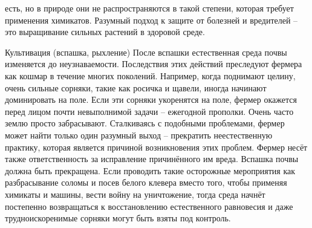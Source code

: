 \documentclass[a4paper]{book}
\begin{document}
есть, но в природе они не распространяются в такой степени, которая требует применения
химикатов. Разумный подход к защите от болезней и вредителей – это выращивание сильных
растений в здоровой среде.

Культивация (вспашка, рыхление)
После вспашки естественная среда почвы изменяется до неузнаваемости. Последствия
этих действий преследуют фермера как кошмар в течение многих поколений. Например,
когда поднимают целину, очень сильные сорняки, такие как росичка и щавели, иногда
начинают доминировать на поле. Если эти сорняки укоренятся на поле, фермер окажется
перед лицом почти невыполнимой задачи – ежегодной прополки. Очень часто землю просто
забрасывают.
Сталкиваясь с подобными проблемами, фермер может найти только один разумный
выход – прекратить неестественную практику, которая является причиной возникновения
этих проблем. Фермер несёт также ответственность за исправление причинённого им вреда.
Вспашка почвы должна быть прекращена. Если проводить такие осторожные мероприятия
как разбрасывание соломы и посев белого клевера вместо того, чтобы применяя химикаты и
машины, вести войну на уничтожение, тогда среда начнёт постепенно возвращаться к
восстановлению естественного равновесия и даже трудноискоренимые сорняки могут быть
взяты под контроль.
\end{document}
